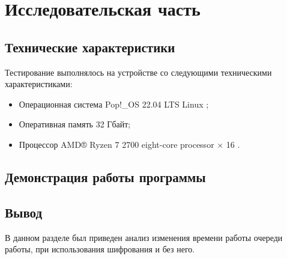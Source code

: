 \section{\large Исследовательская часть}

\subsection{Технические характеристики}

Тестирование выполнялось на устройстве со следующими техническими характеристиками:

\begin{itemize}
	\item Операционная система Pop!\_OS 22.04 LTS \cite{ubuntu} Linux \cite{linux};
	\item Оперативная память 32 Гбайт;
	\item Процессор AMD® Ryzen 7 2700 eight-core processor × 16 \cite{amd}.
\end{itemize}

\subsection{Демонстрация работы программы}



\subsection{Вывод}

В данном разделе был приведен анализ изменения времени работы очереди работы, 
при использования шифрования и без него.